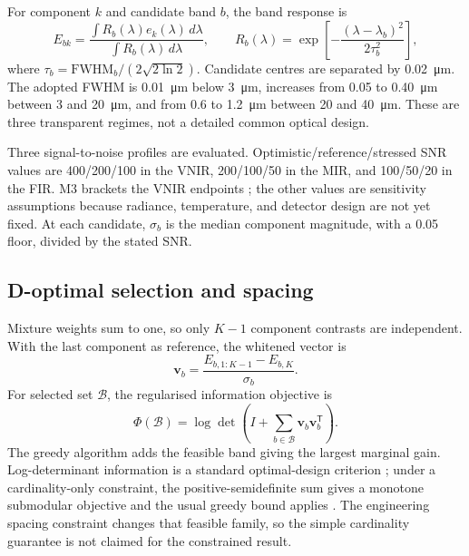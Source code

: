\documentclass[a4paper,10pt,twocolumn]{article}
\begin{document}
For component $k$ and candidate band $b$, the band response is
\begin{equation}
 E_{bk}=\frac{\int R_b(\lambda)e_k(\lambda)\,d\lambda}
 {\int R_b(\lambda)\,d\lambda},\qquad
 R_b(\lambda)=\exp\!\left[-\frac{(\lambda-\lambda_b)^2}{2\tau_b^2}\right],
\end{equation}
where $\tau_b=\mathrm{FWHM}_b/(2\sqrt{2\ln2})$. Candidate centres are separated by \SI{0.02}{\micro\metre}. The adopted FWHM is \SI{0.01}{\micro\metre} below \SI{3}{\micro\metre}, increases from 0.05 to \SI{0.40}{\micro\metre} between 3 and \SI{20}{\micro\metre}, and from 0.6 to \SI{1.2}{\micro\metre} between 20 and \SI{40}{\micro\metre}. These are three transparent regimes, not a detailed common optical design.

Three signal-to-noise profiles are evaluated. Optimistic/reference/stressed SNR values are 400/200/100 in the VNIR, 200/100/50 in the MIR, and 100/50/20 in the FIR. M3 brackets the VNIR endpoints \cite{green2011m3}; the other values are sensitivity assumptions because radiance, temperature, and detector design are not yet fixed. At each candidate, $\sigma_b$ is the median component magnitude, with a 0.05 floor, divided by the stated SNR.

\subsection{D-optimal selection and spacing}

Mixture weights sum to one, so only $K-1$ component contrasts are independent. With the last component as reference, the whitened vector is
\begin{equation}
 \mathbf v_b=\frac{E_{b,1:K-1}-E_{b,K}}{\sigma_b}.
\end{equation}
For selected set $\mathcal B$, the regularised information objective is
\begin{equation}
 \Phi(\mathcal B)=\log\det\!\left(I+\sum_{b\in\mathcal B}\mathbf v_b\mathbf v_b^{\mathsf T}\right).
\end{equation}
The greedy algorithm adds the feasible band giving the largest marginal gain. Log-determinant information is a standard optimal-design criterion \cite{silvey1980optimal}; under a cardinality-only constraint, the positive-semidefinite sum gives a monotone submodular objective and the usual greedy bound applies \cite{nemhauser1978submodular,krause2008sensor}. The engineering spacing constraint changes that feasible family, so the simple cardinality guarantee is not claimed for the constrained result.
\end{document}

